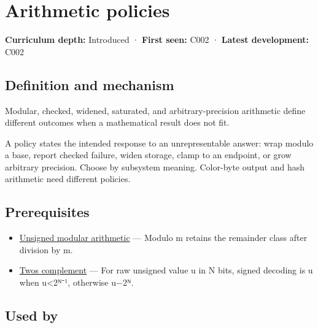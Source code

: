 \hypertarget{appendix-2ed044358b82}{}\label{referencestart:appendix-2ed044358b82}
\section{Arithmetic policies}\label{appendix-2ed044358b82-arithmetic-policies}

\textbf{Curriculum depth:} Introduced · \textbf{First seen:} C002 · \textbf{Latest development:} C002

\begin{allmightroledefinition}

\subsection{Definition and mechanism}\label{appendix-2ed044358b82-definition-and-mechanism}

Modular, checked, widened, saturated, and arbitrary-precision arithmetic define different outcomes when a mathematical result does not fit.

\end{allmightroledefinition}

A policy states the intended response to an unrepresentable answer: wrap modulo a base, report checked failure, widen storage, clamp to an endpoint, or grow arbitrary precision. Choose by subsystem meaning. Color-byte output and hash arithmetic need different policies.

\subsection{Prerequisites}\label{appendix-2ed044358b82-prerequisites}

\begin{itemize}
\tightlist
\item
  \hyperref[appendix-c99977d88b33]{Unsigned modular arithmetic} --- Modulo m retains the remainder class after division by m.
\item
  \hyperref[appendix-4fbc03d20829]{Two\textquotesingle s complement} --- For raw unsigned value u in N bits, signed decoding is u when u\textless2ᴺ⁻¹, otherwise u−2ᴺ.
\end{itemize}

\subsection{Used by}\label{appendix-2ed044358b82-used-by}

